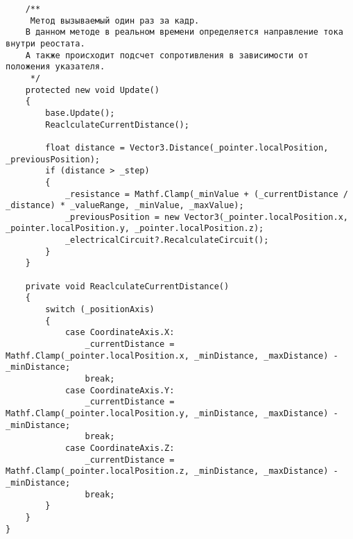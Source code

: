 \begin{verbatim}
    /**
     Метод вызываемый один раз за кадр.
    В данном методе в реальном времени определяется направление тока внутри реостата.
    А также происходит подсчет сопротивления в зависимости от положения указателя.
     */
    protected new void Update()
    {
        base.Update();
        ReaclculateCurrentDistance();

        float distance = Vector3.Distance(_pointer.localPosition, _previousPosition);
        if (distance > _step)
        {
            _resistance = Mathf.Clamp(_minValue + (_currentDistance / _distance) * _valueRange, _minValue, _maxValue);
            _previousPosition = new Vector3(_pointer.localPosition.x, _pointer.localPosition.y, _pointer.localPosition.z);
            _electricalCircuit?.RecalculateCircuit();
        }
    }

    private void ReaclculateCurrentDistance()
    {
        switch (_positionAxis)
        {
            case CoordinateAxis.X:
                _currentDistance = Mathf.Clamp(_pointer.localPosition.x, _minDistance, _maxDistance) - _minDistance;
                break;
            case CoordinateAxis.Y:
                _currentDistance = Mathf.Clamp(_pointer.localPosition.y, _minDistance, _maxDistance) - _minDistance;
                break;
            case CoordinateAxis.Z:
                _currentDistance = Mathf.Clamp(_pointer.localPosition.z, _minDistance, _maxDistance) - _minDistance;
                break;
        }
    }
}

\end{verbatim}
